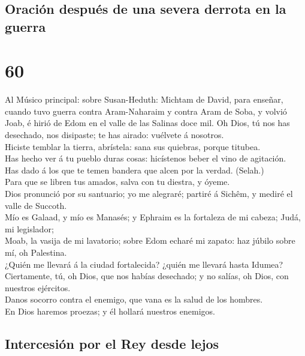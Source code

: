 \hypertarget{oraciuxf3n-despuuxe9s-de-una-severa-derrota-en-la-guerra}{%
\subsection{Oración después de una severa derrota en la
guerra}\label{oraciuxf3n-despuuxe9s-de-una-severa-derrota-en-la-guerra}}

\hypertarget{section-59}{%
\section{60}\label{section-59}}

 Al Músico principal: sobre Susan-Heduth: Michtam de
David, para enseñar, cuando tuvo guerra contra Aram-Naharaim y contra
Aram de Soba, y volvió Joab, é hirió de Edom en el valle de las Salinas
doce mil. Oh Dios, tú nos has desechado, nos disipaste; te has airado:
vuélvete á nosotros.\\
 Hiciste temblar la tierra, abrístela: sana sus quiebras,
porque titubea.\\
 Has hecho ver á tu pueblo duras cosas: hicístenos beber
el vino de agitación.\\
 Has dado á los que te temen bandera que alcen por la
verdad. (Selah.)\\
 Para que se libren tus amados, salva con tu diestra, y
óyeme.\\
 Dios pronunció por su santuario; yo me alegraré; partiré
á Sichêm, y mediré el valle de Succoth.\\
 Mío es Galaad, y mío es Manasés; y Ephraim es la
fortaleza de mi cabeza; Judá, mi legislador;\\
 Moab, la vasija de mi lavatorio; sobre Edom echaré mi
zapato: haz júbilo sobre mí, oh Palestina.\\
 ¿Quién me llevará á la ciudad fortalecida? ¿quién me
llevará hasta Idumea?\\
 Ciertamente, tú, oh Dios, que nos habías desechado; y no
salías, oh Dios, con nuestros ejércitos.\\
 Danos socorro contra el enemigo, que vana es la salud de
los hombres.\\
 En Dios haremos proezas; y él hollará nuestros enemigos.

\hypertarget{intercesiuxf3n-por-el-rey-desde-lejos}{%
\subsection{Intercesión por el Rey desde
lejos}\label{intercesiuxf3n-por-el-rey-desde-lejos}}

